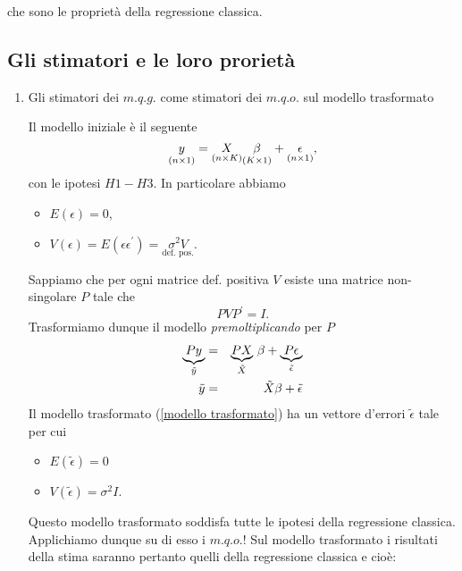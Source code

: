 \documentclass[a4paper]{report}
\newcounter{def}
\theoremstyle{remark}
\begin{document}
\begin{enumerate}
che sono le propriet\`{a} della regressione classica.
\end{enumerate}

\subsection{Gli stimatori e le loro proriet\`{a}}

\begin{enumerate}
\item Gli stimatori dei $m.q.g.$ come stimatori dei $m.q.o.$ sul modello
trasformato

Il modello iniziale \`{e} il seguente 
\begin{equation*}
\underset{(n\times 1)}{y}=\underset{(n\times K)}{X}\underset{(K\times 1)}{%
\beta }+\underset{(n\times 1)}{\epsilon },
\end{equation*}%
con le ipotesi $H1-H3$. In particolare abbiamo

\begin{itemize}
\item $E(\epsilon )=0$,

\item $V(\epsilon )=E(\epsilon \epsilon^{\prime })=\underset{\text{def. pos.}%
}{\sigma ^{2}V}$.
\end{itemize}

Sappiamo che per ogni matrice def. positiva $V$ esiste una matrice
non-singolare $P$ tale che 
\begin{equation*}
PVP^{\prime }=I.
\end{equation*}%
Trasformiamo dunque il modello \textit{premoltiplicando} per $P$ 
\begin{eqnarray}
\underset{\tilde{y}}{\underbrace{Py}} &=&\underset{\tilde{X}}{\underbrace{PX}%
}\ \beta +\underset{\tilde{\epsilon}}{\underbrace{P\epsilon }}  \notag \\
\tilde{y} &=&\tilde{X}\beta +\tilde{\epsilon}  \label{modello trasformato}
\end{eqnarray}
Il modello trasformato (\ref{modello trasformato}) ha un vettore d'errori $%
\tilde{\epsilon}$ tale per cui

\begin{itemize}
\item $E(\tilde{\epsilon})=0$

\item $V(\tilde{\epsilon})=\sigma ^{2}I$.
\end{itemize}

Questo modello trasformato soddisfa tutte le ipotesi della regressione
classica. Applichiamo dunque su di esso i $m.q.o.$! Sul modello trasformato
i risultati della stima saranno pertanto quelli della regressione classica e
cio\`{e}:


\end{enumerate}
\end{document}
